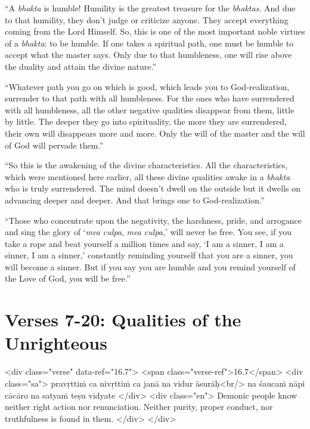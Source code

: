 \enquote{A \textit{bhakta} is humble! Humility is the greatest treasure for the \textit{bhaktas}. And due to that humility, they don’t judge or criticize anyone. They accept everything coming from the Lord Himself. So, this is one of the most important noble virtues of a \textit{bhakta}: to be humble. If one takes a spiritual path, one must be humble to accept what the master says. Only due to that humbleness, one will rise above the duality and attain the divine nature.}

\enquote{Whatever path you go on which is good, which leads you to God-realization, surrender to that path with all humbleness. For the ones who have surrendered with all humbleness, all the other negative qualities disappear from them, little by little. The deeper they go into spirituality, the more they are surrendered, their own will disappears more and more. Only the will of the master and the will of God will pervade them.}

\enquote{So this is the awakening of the divine characteristics. All the characteristics, which were mentioned here earlier, all these divine qualities awake in a \textit{bhakta} who is truly surrendered. The mind doesn’t dwell on the outside but it dwells on advancing deeper and deeper. And that brings one to God-realization.}

\enquote{Those who concentrate upon the negativity, the harshness, pride, and arrogance and sing the glory of \enquote{\textit{mea culpa}, \textit{mea culpa},} will never be free. You see, if you take a rope and beat yourself a million times and say, \enquote{I am a sinner, I am a sinner, I am a sinner,} constantly reminding yourself that you are a sinner, you will become a sinner. But if you say you are humble and you remind yourself of the Love of God, you will be free.}

\section{Verses 7-20: Qualities of the Unrighteous}\label{sec-verses-7-20-qualities-of-the-unrighteous}

\begin{html}
<div class="verse" data-ref="16.7">
  <span class="verse-ref">16.7</span>
  <div class="sa">
    pravṛttiṁ ca nivṛttiṁ ca janā na vidur āsurāḥ<br/>
    na śaucaṁ nāpi cācāro na satyaṁ teṣu vidyate
  </div>
  <div class="en">
    Demonic people know neither right action nor renunciation. Neither purity, proper conduct, nor truthfulness is found in them.
  </div>
</div>
\end{html}



